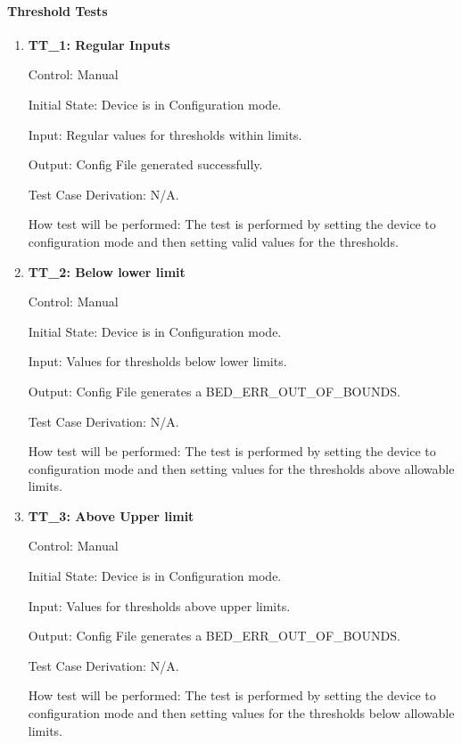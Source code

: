 \documentclass[12pt, titlepage]{article}
\begin{document}
\paragraph{Threshold Tests}
\begin{enumerate}
	\item{\textbf{TT\_1: Regular Inputs} \\}
	
		Control: Manual 
							
		Initial State: Device is in Configuration mode.
							
		Input: Regular values for thresholds within limits.
		
		Output: Config File generated successfully.
		
		Test Case Derivation: N/A.
							
		How test will be performed: The test is performed by setting the device to configuration mode and then setting valid values for the thresholds.

	\item{\textbf{TT\_2: Below lower limit} \\}
	
		Control: Manual 
							
		Initial State: Device is in Configuration mode.
							
		Input: Values for thresholds below lower limits.
		
		Output: Config File generates a BED\_ERR\_OUT\_OF\_BOUNDS.
		
		Test Case Derivation: N/A.
							
		How test will be performed: The test is performed by setting the device to configuration mode and then setting values for the thresholds above allowable limits.

	\item{\textbf{TT\_3: Above Upper limit }\\}
	
		Control: Manual 
							
		Initial State: Device is in Configuration mode.
							
		Input: Values for thresholds above upper limits.
		
		Output: Config File generates a BED\_ERR\_OUT\_OF\_BOUNDS.
		
		Test Case Derivation: N/A.
							
		How test will be performed: The test is performed by setting the device to configuration mode and then setting values for the thresholds below allowable limits.


\end{enumerate}
\end{document}
